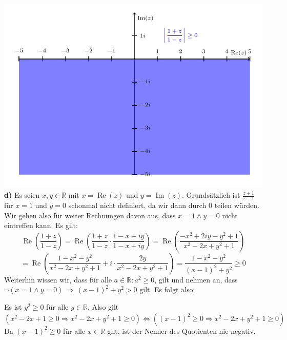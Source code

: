 \documentclass[a4paper,graphics,11pt]{article}
\newcommand{\re}{\operatorname{Re}}
\newcommand{\im}{\operatorname{Im}}
\begin{document}
\newpage
\qquad\qquad\qquad\includegraphics{graphics/graph5.pdf}\\
\textbf{d)}
Es seien $x,y \in \mathbb{R}$ mit $x=\re(z)$ und $y=\im(z)$.
Grundsätzlich ist $\frac{z+1}{z-1}$ für $x=1$ und $y=0$ schonmal nicht definiert, da wir
dann durch 0 teilen würden. Wir gehen also für weiter Rechnungen davon aus, dass
$x=1 \land y=0$ nicht eintreffen kann. Es gilt:
$$
    \re\left(\frac{1+z}{1-z}\right)
    = \re\left(\frac{1+z}{1-z} \cdot \frac{1-x+iy}{1-x+iy}\right)
    = \re\left(\frac{-x^2+2iy-y^2+1}{x^2-2x+y^2+1}\right)
$$$$
    = \re\left(\frac{1-x^2-y^2}{x^2-2x+y^2+1} + i\cdot \frac{2y}{x^2-2x+y^2+1}\right)
    = \frac{1-x^2-y^2}{(x-1)^2+y^2} \geq 0
$$
Weiterhin wissen wir, dass für alle $a \in \mathbb{R}\colon a^2 \geq 0$, gilt und nehmen
an, dass\\
$\lnot(x = 1 \land y = 0) \,\Longrightarrow\, (x-1)^2+y^2 > 0$ gilt. Es folgt also:

Es ist $y^2 \geq 0$ für alle $y \in \mathbb{R}$. Also gilt
$$
    \left( x^2-2x+1 \geq 0 \Longrightarrow x^2-2x+y^2+1 \geq 0 \right)
    \Longleftrightarrow
    \left( \left( x-1 \right)^2 \geq 0 \Longrightarrow x^2-2x+y^2+1 \geq 0 \right)
$$
Da $\left( x-1 \right)^2 \geq 0$ für alle $x \in \mathbb{R}$ gilt, ist der Nenner des Quotienten nie negativ.
\end{document}
